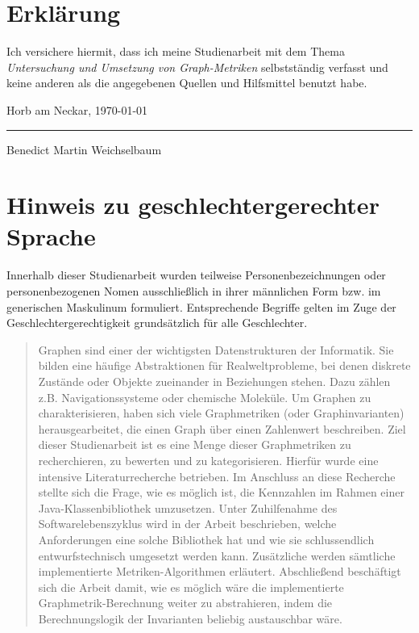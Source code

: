 \documentclass[a4paper,12pt,ngerman,chapterprefix=false,listof=totoc,bibliography=totoc]{scrreprt}
\begin{document}
\section*{Erklärung}
\thispagestyle{empty}
Ich versichere hiermit, dass ich meine Studienarbeit mit dem Thema \textit{Untersuchung und Umsetzung von Graph-Metriken} selbstständig verfasst und keine anderen als die angegebenen Quellen und Hilfsmittel benutzt habe. \vspace{1.6cm}\newline
{Horb am Neckar, \today\vspace{1.2cm}\par\vspace{1.5cm}}
{\noindent\rule{6cm}{.4pt}\newline Benedict Martin Weichselbaum}
\pagebreak
\section*{Hinweis zu geschlechtergerechter Sprache}
\thispagestyle{empty}
Innerhalb dieser Studienarbeit wurden teilweise Personenbezeichnungen oder personenbezogenen Nomen ausschließlich in ihrer männlichen Form bzw. im generischen Maskulinum formuliert. Entsprechende Begriffe gelten im Zuge der Geschlechtergerechtigkeit grundsätzlich für alle Geschlechter.

\begin{abstract}
Graphen sind einer der wichtigsten Datenstrukturen der Informatik. Sie bilden eine häufige Abstraktionen für Realweltprobleme, bei denen diskrete Zustände oder Objekte zueinander in Beziehungen stehen. Dazu zählen z.B. Navigationssysteme oder chemische Moleküle. Um Graphen zu charakterisieren, haben sich viele Graphmetriken (oder Graphinvarianten) herausgearbeitet, die einen Graph über einen Zahlenwert beschreiben. Ziel dieser Studienarbeit ist es eine Menge dieser Graphmetriken zu recherchieren, zu bewerten und zu kategorisieren. Hierfür wurde eine intensive Literaturrecherche betrieben. Im Anschluss an diese Recherche stellte sich die Frage, wie es möglich ist, die Kennzahlen im Rahmen einer Java-Klassenbibliothek umzusetzen. Unter Zuhilfenahme des Softwarelebenszyklus wird in der Arbeit beschrieben, welche Anforderungen eine solche Bibliothek hat und wie sie schlussendlich entwurfstechnisch umgesetzt werden kann. Zusätzliche werden sämtliche implementierte Metriken-Algorithmen erläutert. Abschließend beschäftigt sich die Arbeit damit, wie es möglich wäre die implementierte Graphmetrik-Berechnung weiter zu abstrahieren, indem die Berechnungslogik der Invarianten beliebig austauschbar wäre.
\end{abstract}
\end{document}
